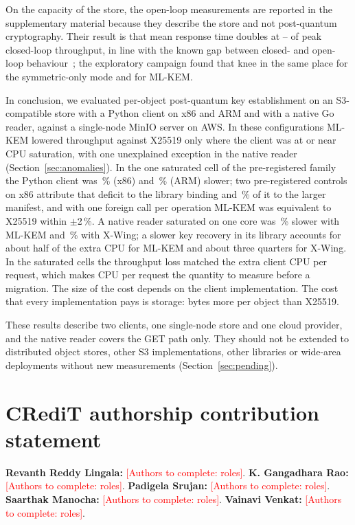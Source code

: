 \documentclass[review,12pt]{elsarticle}
\newcommand{\authorsgap}[1]{\textcolor{red}{[Authors to complete: #1]}}
\begin{document}
On the capacity of the store, the open-loop measurements are reported in the supplementary
material because they describe the store and not post-quantum cryptography. Their result is that
mean response time doubles at \RevQMidRhoKneeLo--\RevQSmallRhoKneeHi{} of peak closed-loop
throughput, in line with the known gap between closed- and open-loop
behaviour~\cite{schroeder2006}; the exploratory campaign found that knee in the same place for
the symmetric-only mode and for ML-KEM.

In conclusion, we evaluated per-object post-quantum key establishment on an S3-compatible store with a Python
client on x86 and ARM and with a native Go reader, against a single-node MinIO server on AWS. In
these configurations ML-KEM lowered throughput against X25519 only where the client was at or
near CPU saturation, with one unexplained exception in the native reader
(Section~\ref{sec:anomalies}). In the one saturated cell of the pre-registered family the
Python client was \RevHotDeficit\,\% (x86) and \ArmHotDeficit\,\% (ARM) slower; two
pre-registered controls on x86 attribute that deficit to the library binding and
\AudPadShare\,\% of it to the larger manifest, and with one foreign call per operation ML-KEM was
equivalent to X25519 within $\pm$2\,\%. A native reader saturated on one core was
\AudNOneMlkemDeficit\,\% slower with ML-KEM and \AudNOneXwingDeficit\,\% with X-Wing; a slower
key recovery in its library accounts for about half of the extra CPU for ML-KEM and about three
quarters for X-Wing. In the saturated cells the throughput loss matched the extra client CPU per
request, which makes CPU per request the quantity to measure before a migration. The size of
the cost depends on the client implementation. The cost that every implementation pays is
storage: \RevMetaIntrinsic{} bytes more per object than X25519.

These results describe two clients, one single-node store and one cloud provider, and the
native reader covers the GET path only. They should not be extended to distributed object
stores, other S3 implementations, other libraries or wide-area deployments without new
measurements (Section~\ref{sec:pending}).

\section*{CRediT authorship contribution statement}
\textbf{Revanth Reddy Lingala:} \authorsgap{roles}.
\textbf{K. Gangadhara Rao:} \authorsgap{roles}.
\textbf{Padigela Srujan:} \authorsgap{roles}.
\textbf{Saarthak Manocha:} \authorsgap{roles}.
\textbf{Vainavi Venkat:} \authorsgap{roles}.
\end{document}
